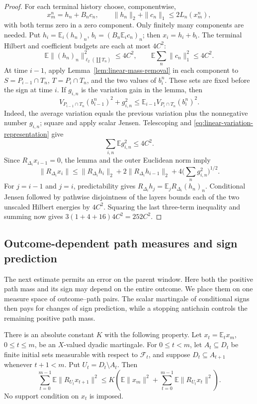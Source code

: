 \begin{proof}
For each terminal history choose, componentwise,
\[
 x_m^n=h_n+B_nc_n,
 \qquad \|h_n\|_2+\|c_n\|_1\le2L_n(x_m^n),
\]
with both terms zero in a zero component.  Only finitely many
components are needed.  Put \(h_i=\mathbb E_i(h_n)_n\),
\(b_i=(B_n\mathbb E_i c_n)_n\); then \(x_i=h_i+b_i\).  The terminal
Hilbert and coefficient budgets are each at most \(4C^2\):
\[
 \mathbb E\|(h_n)_n\|_{\ell_2(\coprod T_n)}^2\le4C^2,
 \qquad \mathbb E\sum_n\|c_n\|_1^2\le4C^2.
\]
At time \(i-1\), apply Lemma~\ref{lem:linear-mass-removal} in each
component to \(S=P_{i-1}\cap T_n\), \(T=P_i\cap T_n\), and the two
values of \(b_i^n\).  These sets are fixed before the sign at time
\(i\).  If \(g_{i,n}\) is the variation gain in the lemma, then
\[
 V_{P_{i-1}\cap T_n}(b_{i-1}^n)^2+g_{i,n}^2
 \le\mathbb E_{i-1}V_{P_i\cap T_n}(b_i^n)^2.
\]
Indeed, the average variation equals the previous variation plus the
nonnegative number \(g_{i,n}\); square and apply scalar Jensen.
Telescoping and \eqref{eq:linear-variation-representation} give
\[
 \sum_{i,n}\mathbb E g_{i,n}^2\le4C^2.
\]
Since \(R_{\Delta_i}x_{i-1}=0\), the lemma and the outer Euclidean norm imply
\[
 \|R_{\Delta_i}x_i\|
 \le\|R_{\Delta_i}h_i\|_2+2\|R_{\Delta_i}h_{i-1}\|_2
      +4\Big(\sum_ng_{i,n}^2\Big)^{1/2}.
\]
For \(j=i-1\) and \(j=i\), predictability gives
\(R_{\Delta_i}h_j=\mathbb E_jR_{\Delta_i}(h_n)_n\).
Conditional Jensen followed by pathwise disjointness of the layers
bounds each of the two unscaled Hilbert energies by \(4C^2\).
Squaring the last three-term inequality and summing now gives
\(3(1+4+16)4C^2=252C^2\).
\end{proof}

\subsection{Outcome-dependent path measures and sign prediction}

The next estimate permits an error on the parent window.  Here both the
positive path mass and its sign may depend on the entire outcome.  We
place them on one measure space of outcome--path pairs.  The scalar
martingale of conditional signs then pays for changes of sign
prediction, while a stopping antichain controls the remaining positive
path mass.

\begin{theorem}\label{thm:linear-sign-energy}
There is an absolute constant \(K\) with the following property.
Let \(x_t=\mathbb E_t x_m\), \(0\le t\le m\), be an \(X\)-valued dyadic
martingale.  For \(0\le t<m\), let \(A_t\subseteq D_t\) be finite
initial sets measurable with respect to \(\mathcal F_t\), and suppose
\(D_t\subseteq A_{t+1}\) whenever \(t+1<m\).  Put
\(U_t=D_t\setminus A_t\).  Then
\begin{equation}\label{eq:linear-sign-energy}
 \sum_{t=0}^{m-1}\mathbb E\|R_{U_t}x_{t+1}\|^2
 \le K\left(\mathbb E\|x_m\|^2+
                  \sum_{t=0}^{m-1}\mathbb E\|R_{U_t}x_t\|^2\right).
\end{equation}
No support condition on \(x_t\) is imposed.
\end{theorem}

